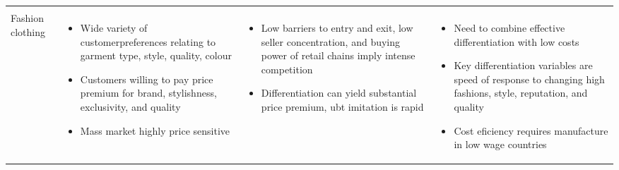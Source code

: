 {\begin{table}
\begin{tabular}{p{1cm} p{3cm} p{3.5cm} p{3cm}}
\begin{itemize}
		\end{itemize} \\
	Fashion clothing & 
		\begin{itemize}
			\item Wide variety of customerpreferences relating to garment type, style, quality, colour
			\item Customers willing to pay price premium for brand, stylishness, exclusivity, and quality
			\item Mass market highly price sensitive
		\end{itemize} &
		\begin{itemize}
			\item Low barriers to entry and exit, low seller concentration, and buying power of retail chains imply intense competition
			\item Differentiation can yield substantial price premium, ubt imitation is rapid
		\end{itemize} & 
		\begin{itemize}
			\item Need to combine effective differentiation with low costs
			\item Key differentiation variables are speed of response to changing high fashions, style, reputation, and quality
			\item Cost eficiency requires manufacture in low wage countries
		\end{itemize} \\
	\midrule
	\bottomrule
	\end{tabular}
	\end{table}
}

